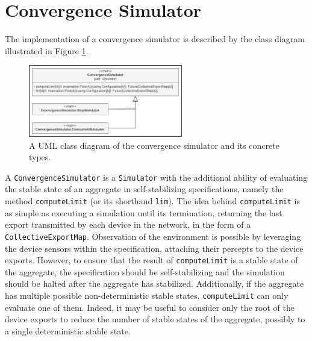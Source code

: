 
\section{Convergence Simulator}
\label{section:implementation:convergence-simulator}

The implementation of a convergence simulator is described by the class diagram
illustrated in Figure \ref{figure:convergence-simulator-class-diagram}.

\begin{figure}[!ht]
  \centering
  \includegraphics[width=0.60\textwidth]{resources/figures/convergence-simulator-class-diagram.png}
  \caption{
    A UML class diagram of the convergence simulator
    and its concrete types.
  }
  \label{figure:convergence-simulator-class-diagram}
\end{figure}

A \texttt{ConvergenceSimulator} is a \texttt{Simulator} with the additional
ability of evaluating the stable state of an aggregate in self-stabilizing
specifications, namely the method \texttt{computeLimit} (or its shorthand
\texttt{lim}). The idea behind \texttt{computeLimit} is as simple as executing
a simulation until its termination, returning the last export transmitted by
each device in the network, in the form of a \texttt{CollectiveExportMap}.
Observation of the environment is possible by leveraging the device sensors
within the specification, attaching their percepts to the device exports.
However, to ensure that the result of \texttt{computeLimit} is a stable state
of the aggregate, the specification should be self-stabilizing and the
simulation should be halted after the aggregate has stabilized. Additionally,
if the aggregate has multiple possible non-deterministic stable states,
\texttt{computeLimit} can only evaluate one of them. Indeed, it may be useful
to consider only the root of the device exports to reduce the number of stable
states of the aggregate, possibly to a single deterministic stable state.

